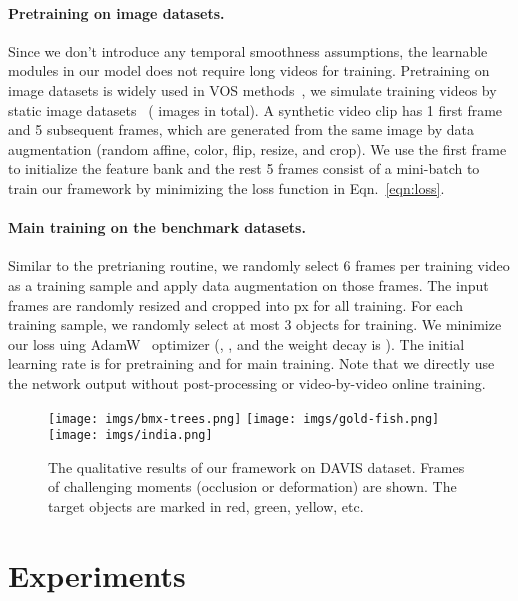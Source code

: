 \documentclass{article}
\begin{document}
\paragraph{Pretraining on image datasets.} 
Since we don't introduce any temporal smoothness assumptions, the learnable modules in our model does not require long videos for training. 
Pretraining on image datasets is widely used in VOS methods~\cite{Perazzi2017, oh_video_2019}, we simulate training videos by static image datasets~\cite{ChengPAMI, shi2015hierarchical, li2014secrets, lin2014microsoft, everingham2010pascal} ( images in total).
A synthetic video clip has 1 first frame and 5 subsequent frames, which are generated from the same image by data augmentation (random affine, color, flip, resize, and crop).
We use the first frame to initialize the feature bank and the rest 5 frames consist of a mini-batch to train our framework by minimizing the loss function  in Eqn.~\ref{eqn:loss}.

\paragraph{Main training on the benchmark datasets.}
Similar to the pretrianing routine, we randomly select 6 frames per training video as a training sample and apply data augmentation on those frames.
The input frames are randomly resized and cropped into px for all training.
For each training sample, we randomly select at most 3 objects for training.
We minimize our loss uing AdamW~\cite{loshchilov2017decoupled} optimizer (, , and the weight decay is ).
The initial learning rate is  for pretraining and  for main training.
Note that we directly use the network output without post-processing or video-by-video online training.

\begin{figure}[h!tb]
    \centering
    \texttt{[image: imgs/bmx-trees.png]}
    \texttt{[image: imgs/gold-fish.png]}
    \texttt{[image: imgs/india.png]}
    \caption{The qualitative results of our framework on DAVIS dataset. Frames of challenging moments (occlusion or deformation) are shown. The target objects are marked in red, green, yellow, etc.}
    \label{fig:qualitative}
\end{figure}

\section{Experiments}
\end{document}
